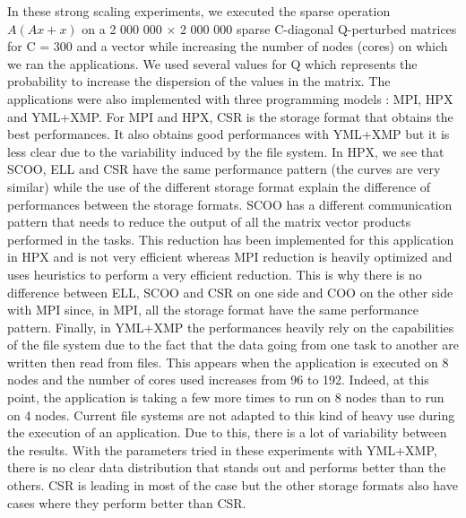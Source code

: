 In these strong scaling experiments, we executed the sparse operation $A(Ax+x)$ on a 2 000 000 $\times$ 2 000 000 sparse C-diagonal Q-perturbed matrices for C = 300 and a vector while increasing the number of nodes (cores) on which we ran the applications.
We used several values for Q which represents the probability to increase the dispersion of the values in the matrix.
The applications were also implemented with three programming models : MPI, HPX and YML+XMP.
For MPI and HPX, CSR is the storage format that obtains the best performances.
It also obtains good performances with YML+XMP but it is less clear due to the variability induced by the file system.
In HPX, we see that SCOO, ELL and CSR have the same performance pattern (the curves are very similar) while the use of the different storage format explain the difference of performances between the storage formats.
SCOO has a different communication pattern that needs to reduce the output of all the matrix vector products performed in the tasks.
This reduction has been implemented for this application in HPX and is not very efficient whereas MPI reduction is heavily optimized and uses heuristics to perform a very efficient reduction.
This is why there is no difference between ELL, SCOO and CSR on one side and COO on the other side with MPI since, in MPI, all the storage format have the same performance pattern.
Finally, in YML+XMP the performances heavily rely on the capabilities of the file system due to the fact that the data going from one task to another are written then read from files.
This appears when the application is executed on 8 nodes and the number of cores used increases from 96 to 192.
Indeed, at this point, the application is taking a few more times to run on 8 nodes than to run on 4 nodes.
Current file systems are not adapted to this kind of heavy use during the execution of an application.
Due to this, there is a lot of variability between the results.
With the parameters tried in these experiments with YML+XMP, there is no clear data distribution that stands out and performs better than the others.
CSR is leading in most of the case but the other storage formats also have cases where they perform better than CSR.

